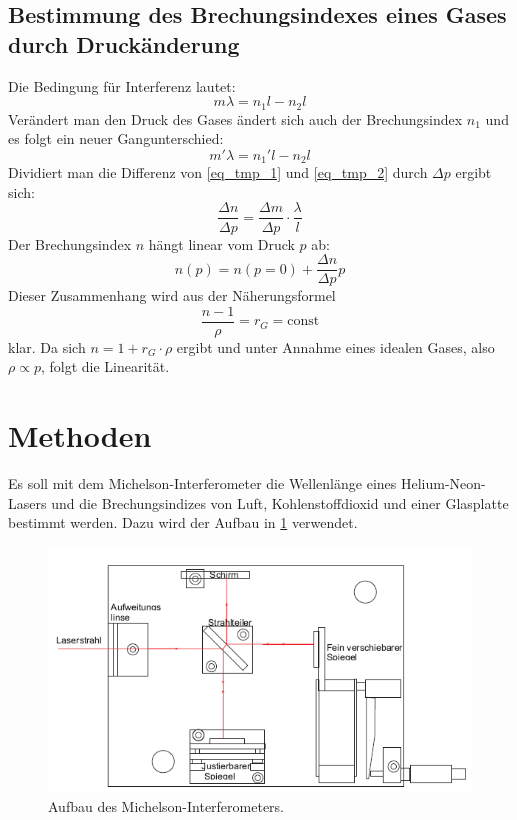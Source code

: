 \documentclass[
	a4paper,
	12pt,
	pagesize,
	ngerman
]{scrartcl}
\begin{document}
	\subsection{Bestimmung des Brechungsindexes eines Gases durch Druckänderung}
	Die Bedingung für Interferenz lautet:
	\begin{equation}
		m\lambda = n_1 l - n_2 l
		\label{eq_tmp_1}
	\end{equation}
	Verändert man den Druck des Gases ändert sich auch der Brechungsindex $n_1$ und es folgt ein neuer Gangunterschied:
	\begin{equation}
		m'\lambda = n_1' l - n_2 l
		\label{eq_tmp_2}
	\end{equation}
	Dividiert man die Differenz von \cref{eq_tmp_1} und \cref{eq_tmp_2} durch $\Delta p$ ergibt sich:
	\begin{equation}
		\frac{\Delta n}{\Delta p} = \frac{\Delta m}{\Delta p} \cdot \frac{\lambda}{l}
		\label{eq_brech_druck}
	\end{equation}
	Der Brechungsindex $n$ hängt linear vom Druck $p$ ab:
	\begin{equation}
		n(p) = n(p=0) + \frac{\Delta n}{\Delta p} p
	\end{equation}
	Dieser Zusammenhang wird aus der Näherungsformel
	\begin{equation}
		\frac{n-1}{\rho} = r_G = \text{const}
	\end{equation}
	klar. Da sich $n = 1+ r_G \cdot \rho$ ergibt und unter Annahme eines idealen Gases, also $\rho \propto p$, folgt die Linearität.


	\section{Methoden}
	Es soll mit dem Michelson-Interferometer die Wellenlänge eines Helium-Neon-Lasers und die Brechungsindizes von Luft, Kohlenstoffdioxid und einer Glasplatte bestimmt werden.
	Dazu wird der Aufbau in \cref{fig_aufbau} verwendet.

	\begin{figure}[H]
		\includegraphics[width=\textwidth]{images/michelson_aufbau}
		\centering
		\caption{Aufbau des Michelson-Interferometers. \cite{Anleitung}}
		\label{fig_aufbau}
	\end{figure}
\end{document}

